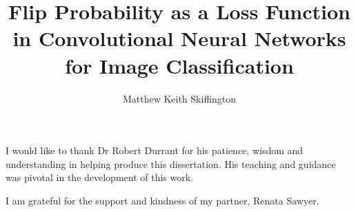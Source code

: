 \documentclass[12pt]{uwthesis17}
\title{Flip Probability as a Loss Function in Convolutional Neural Networks for Image Classification}
\author{Matthew Keith Skiffington}
\begin{document}
\maketitle
\setcounter{page}{2}

\setlength{\parindent}{0pt} %

\begin{abstract}

\end{abstract}
\begin{acknowledgements}

\bigskip

\begin{spacing}{2}


I would like to thank Dr Robert Durrant for his patience, wisdom and understanding in helping produce this dissertation. His teaching and guidance was pivotal in the development of this work.
\bigskip

I am grateful for the support and kindness of my partner, Renata Sawyer.
\bigskip

\end{spacing}

\end{acknowledgements}
\tableofcontents
\listoffigures
\listoftables
\newpage
{}
\setcounter{page}{1}








\end{document}
